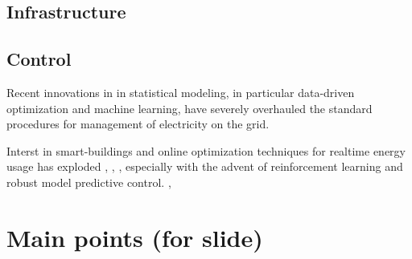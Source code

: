 \documentclass[plain]{article}
\newcommand{\1}{\mathbbm{1}}
\begin{document}
\subsection{Infrastructure}

\subsection{Control}
Recent innovations in in statistical modeling, in particular data-driven optimization and machine learning, have severely overhauled the standard procedures for management of electricity on the grid. 

Interst in smart-buildings and online optimization techniques for realtime energy usage has exploded \cite{yu_review_2021}, \cite{khan_modeling_2022}, \cite{sembroiz_planning_2019}, especially with the advent of reinforcement learning and robust model predictive control. \cite{chen_efficient_2020}, \cite{yang_adaptive_2019}

\section{Main points (for slide)}


\end{document}
